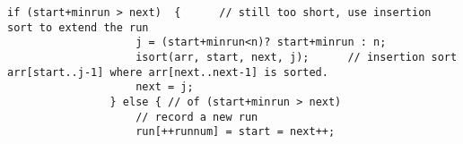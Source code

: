 \documentclass[AMA,STIX1COL]{WileyNJD-v2}
\begin{document}
\begin{lstlisting}[style=CStyle]
                if (start+minrun > next)  {      // still too short, use insertion sort to extend the run                                                                                                       
                    j = (start+minrun<n)? start+minrun : n;                                                                                                                                               
                    isort(arr, start, next, j);      // insertion sort arr[start..j-1] where arr[next..next-1] is sorted.                                                                                                                    
                    next = j;                                                                                                                                                                                      
                } else { // of (start+minrun > next)                                                                                                                                       
                    // record a new run                                                                                                                                                   
                    run[++runnum] = start = next++;                                                                                                                                                       
                                                                                                                                                                                

\end{lstlisting}
\end{document}
